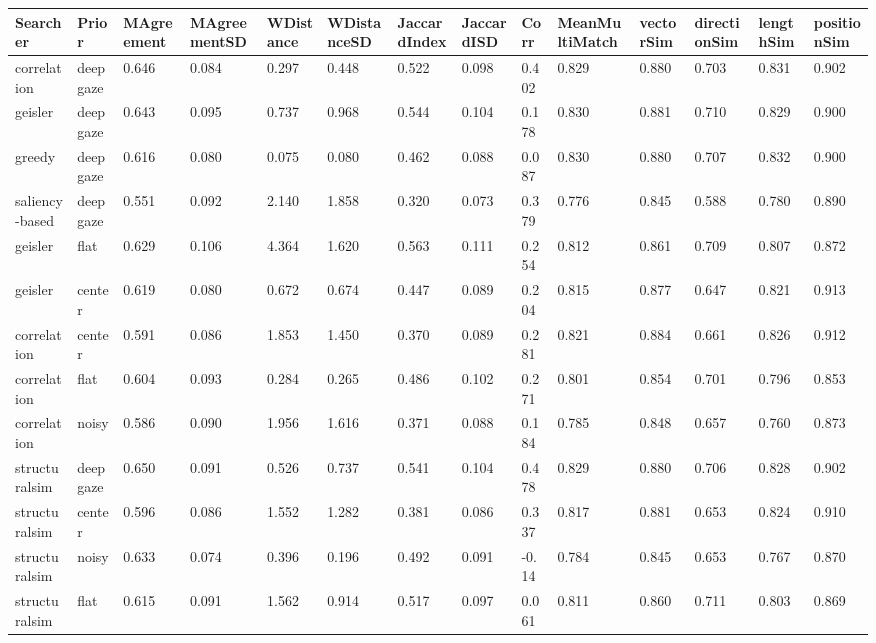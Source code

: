 \begin{tabular}{llllllllllllll}
Searcher & Prior & MAgreement & MAgreementSD & WDistance & WDistanceSD & JaccardIndex & JaccardISD & Corr & MeanMultiMatch & vectorSim & directionSim & lengthSim & positionSim \\ 
\hline 
correlation & deepgaze & 0.646 & 0.084 & 0.297 & 0.448 & 0.522 & 0.098 & 0.402 & 0.829 & 0.880 & 0.703 & 0.831 & 0.902 \\ 
geisler & deepgaze & 0.643 & 0.095 & 0.737 & 0.968 & 0.544 & 0.104 & 0.178 & 0.830 & 0.881 & 0.710 & 0.829 & 0.900 \\ 
greedy & deepgaze & 0.616 & 0.080 & 0.075 & 0.080 & 0.462 & 0.088 & 0.087 & 0.830 & 0.880 & 0.707 & 0.832 & 0.900 \\ 
saliency-based & deepgaze & 0.551 & 0.092 & 2.140 & 1.858 & 0.320 & 0.073 & 0.379 & 0.776 & 0.845 & 0.588 & 0.780 & 0.890 \\ 
geisler & flat & 0.629 & 0.106 & 4.364 & 1.620 & 0.563 & 0.111 & 0.254 & 0.812 & 0.861 & 0.709 & 0.807 & 0.872 \\ 
geisler & center & 0.619 & 0.080 & 0.672 & 0.674 & 0.447 & 0.089 & 0.204 & 0.815 & 0.877 & 0.647 & 0.821 & 0.913 \\ 
correlation & center & 0.591 & 0.086 & 1.853 & 1.450 & 0.370 & 0.089 & 0.281 & 0.821 & 0.884 & 0.661 & 0.826 & 0.912 \\ 
correlation & flat & 0.604 & 0.093 & 0.284 & 0.265 & 0.486 & 0.102 & 0.271 & 0.801 & 0.854 & 0.701 & 0.796 & 0.853 \\ 
correlation & noisy & 0.586 & 0.090 & 1.956 & 1.616 & 0.371 & 0.088 & 0.184 & 0.785 & 0.848 & 0.657 & 0.760 & 0.873 \\ 
structuralsim & deepgaze & 0.650 & 0.091 & 0.526 & 0.737 & 0.541 & 0.104 & 0.478 & 0.829 & 0.880 & 0.706 & 0.828 & 0.902 \\ 
structuralsim & center & 0.596 & 0.086 & 1.552 & 1.282 & 0.381 & 0.086 & 0.337 & 0.817 & 0.881 & 0.653 & 0.824 & 0.910 \\ 
structuralsim & noisy & 0.633 & 0.074 & 0.396 & 0.196 & 0.492 & 0.091 & -0.14 & 0.784 & 0.845 & 0.653 & 0.767 & 0.870 \\ 
structuralsim & flat & 0.615 & 0.091 & 1.562 & 0.914 & 0.517 & 0.097 & 0.061 & 0.811 & 0.860 & 0.711 & 0.803 & 0.869 \\ 
\hline 
\end{tabular}